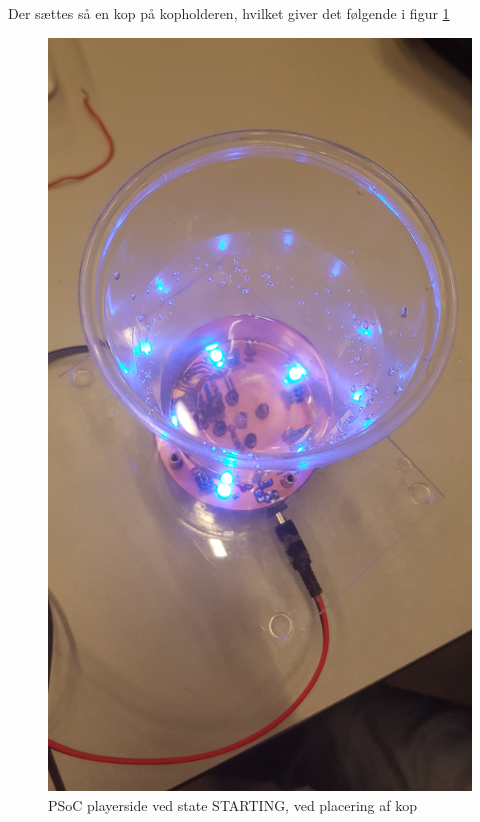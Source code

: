 \documentclass[Integrationstest/Integrationstest_main.tex]{subfiles}
\begin{document}
Der sættes så en kop på kopholderen, hvilket giver det følgende i figur \ref{fig:int_playerside_starting_cup}
\begin{figure}[H]
    \centering
    \includegraphics[width=\textwidth]{Integrationstest/Integrationstest_PlayerSide/graphics/CupSensorInt/STARTING_cup.jpg}
    \caption{PSoC playerside ved state STARTING, ved placering af kop}
    \label{fig:int_playerside_starting_cup}
\end{figure}
\end{document}
